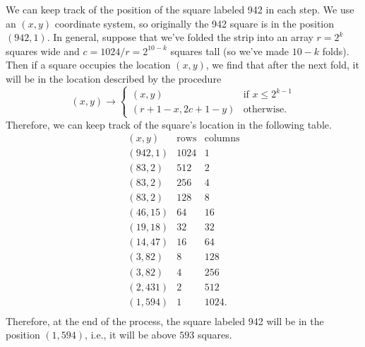 \begin{enumerate}
We can keep track of the position of the square labeled 942 in each step. We use an $(x,y)$ coordinate system, so originally the 942 square is in the position $(942,1)$. In general, suppose that we've folded the strip into an array $r=2^k$ squares wide and $c=1024/r=2^{10-k}$ squares tall (so we've made $10-k$ folds). Then if a square occupies the location $(x,y)$, we find that after the next fold, it will be in the location described by the procedure
 \[(x,y)\to\begin{cases}(x,y)&\text{if }x\le 2^{k-1}\\ (r+1-x,2c+1-y)&\text{otherwise}.\end{cases}\]Therefore, we can keep track of the square's location in the following table.
 \[\begin{array}{c|c|c} (x,y)&\text{rows}&\text{columns}\\\hline (942,1)&1024&1\\ (83,2)&512&2\\ (83,2)&256&4\\ (83,2)&128&8\\ (46,15)&64&16\\ (19,18)&32&32\\ (14,47)&16&64\\ (3,82)&8&128\\ (3,82)&4&256\\ (2,431)&2&512\\ (1,594)&1&1024.\\ \end{array}\]Therefore, at the end of the process, the square labeled 942 will be in the position $(1,594)$, i.e., it will be above $\boxed{593}$ squares.

 


\end{enumerate}